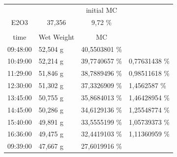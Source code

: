 \begin{table}[]
	\centering
	\begin{tabular}{llll}
		\cline{3-3}
		& \multicolumn{1}{l|}{} & \multicolumn{1}{c|}{initial MC} &  \\ \cline{1-3}
		\multicolumn{1}{|c|}{\cellcolor[HTML]{F8CBAD}E2O3} & \multicolumn{1}{c|}{\cellcolor[HTML]{F8CBAD}37,356} & \multicolumn{1}{c|}{9,72 \%} &  \\ \cline{1-3}
		&  &  &  \\ \cline{1-3}
		\multicolumn{1}{|c|}{time} & \multicolumn{1}{c|}{Wet Weight} & \multicolumn{1}{c|}{MC} &  \\ \cline{1-3}
		\multicolumn{1}{|l|}{09:48:00} & \multicolumn{1}{l|}{52,504 g} & \multicolumn{1}{l|}{40,5503801   \%} &  \\ \hline
		\multicolumn{1}{|l|}{10:49:00} & \multicolumn{1}{l|}{52,214 g} & \multicolumn{1}{l|}{39,7740657   \%} & \multicolumn{1}{l|}{0,77631438 \%} \\ \hline
		\multicolumn{1}{|l|}{11:29:00} & \multicolumn{1}{l|}{51,846 g} & \multicolumn{1}{l|}{38,7889496   \%} & \multicolumn{1}{l|}{0,98511618 \%} \\ \hline
		\multicolumn{1}{|l|}{12:30:00} & \multicolumn{1}{l|}{51,302 g} & \multicolumn{1}{l|}{37,3326909   \%} & \multicolumn{1}{l|}{1,4562587 \%} \\ \hline
		\multicolumn{1}{|l|}{13:45:00} & \multicolumn{1}{l|}{50,755 g} & \multicolumn{1}{l|}{35,8684013   \%} & \multicolumn{1}{l|}{1,46428954 \%} \\ \hline
		\multicolumn{1}{|l|}{14:45:00} & \multicolumn{1}{l|}{50,286 g} & \multicolumn{1}{l|}{34,6129136   \%} & \multicolumn{1}{l|}{1,25548774 \%} \\ \hline
		\multicolumn{1}{|l|}{15:40:00} & \multicolumn{1}{l|}{49,891 g} & \multicolumn{1}{l|}{33,5555199   \%} & \multicolumn{1}{l|}{1,05739373 \%} \\ \hline
		\multicolumn{1}{|l|}{16:36:00} & \multicolumn{1}{l|}{49,475 g} & \multicolumn{1}{l|}{\cellcolor[HTML]{0070C0}32,4419103   \%} & \multicolumn{1}{l|}{1,11360959 \%} \\ \hline
		\multicolumn{1}{|l|}{\cellcolor[HTML]{A5A5A5}09:39:00} & \multicolumn{1}{l|}{47,667 g} & \multicolumn{1}{l|}{27,6019916   \%} &  \\ \hline

\end{tabular}
\end{table}
